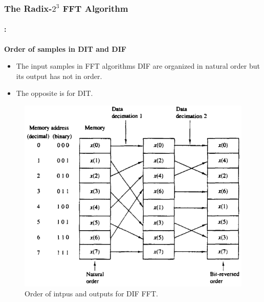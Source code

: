 \begin{frame}
  	\frametitle{\textbf{The Radix-$2^3$ FFT  Algorithm}}
	\framesubtitle{\secname : \subsecname}
	\begin{block}{\centering \textbf{Order of samples in DIT and DIF}}
		\begin{itemize}
			\item  The input samples in FFT algorithms DIF are organized in natural order but its output has not in order.
			\item The opposite is for DIT.
		\end{itemize}
	\end{block}    	
    \begin{figure}[h!] \centering
    \includegraphics[width=0.4\paperwidth]{./image/dif_order.png}
    	\caption{\footnotesize Order of intpus and outputs for DIF FFT.} %
    \end{figure}
\end{frame}



